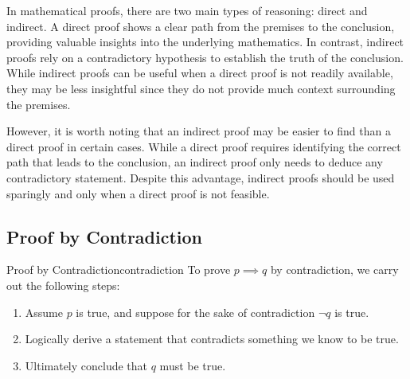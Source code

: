 In mathematical proofs, there are two main types of reasoning: direct and indirect. A direct proof shows a clear path from the premises to the conclusion, providing valuable insights into the underlying mathematics. In contrast, indirect proofs rely on a contradictory hypothesis to establish the truth of the conclusion. While indirect proofs can be useful when a direct proof is not readily available, they may be less insightful since they do not provide much context surrounding the premises.

However, it is worth noting that an indirect proof may be easier to find than a direct proof in certain cases. While a direct proof requires identifying the correct path that leads to the conclusion, an indirect proof only needs to deduce any contradictory statement. Despite this advantage, indirect proofs should be used sparingly and only when a direct proof is not feasible.




\subsection*{Proof by Contradiction}

\begin{tecbox}{Proof by Contradiction}{contradiction}
    To prove $p \implies q$ by contradiction, we carry out the following steps:
    \begin{enumerate}
        \item Assume $p$ is true, and suppose for the sake of contradiction $\neg q$ is true.
        \item Logically derive a statement that contradicts something we know to be true.
        \item Ultimately conclude that $q$ must be true.
    \end{enumerate}
\end{tecbox}

